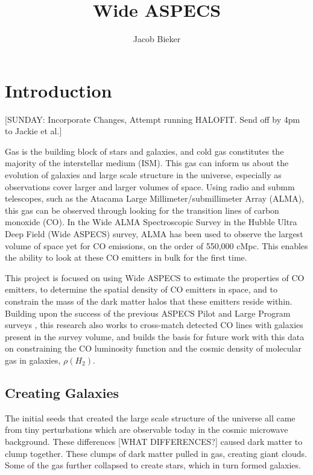 \documentclass[twoside,single]{lion-msc}
\title{Wide ASPECS}
\author{Jacob Bieker}
\affiliation{Leiden Observatory, Leiden University}
\begin{document}
\maketitle

\setcounter{page}{2}
\tableofcontents
\cleardoublepage

\setcounter{page}{1}
\chapter{Introduction}

[SUNDAY: Incorporate Changes, Attempt running HALOFIT. Send off by 4pm to Jackie et al.] 

Gas is the building block of stars and galaxies, and cold gas constitutes the majority of the interstellar medium (ISM). This gas can inform us about the evolution of galaxies and large scale structure in the universe, especially as observations cover larger and larger volumes of space. Using radio and submm telescopes, such as the Atacama Large Millimeter/submillimeter Array (ALMA), this gas can be observed through looking for the transition lines of carbon monoxide (CO). In the Wide ALMA Spectroscopic Survey in the Hubble Ultra Deep Field (Wide ASPECS) survey, ALMA has been used to observe the largest volume of space yet for CO emissions, on the order of 550,000 cMpc. This enables the ability to look at these CO emitters in bulk for the first time.

This project is focused on using Wide ASPECS to estimate the properties of CO emitters, to determine the spatial density of CO emitters in space, and to constrain the mass of the dark matter halos that these emitters reside within. Building upon the success of the previous ASPECS Pilot and Large Program surveys \cite{walter2016alma, decarli2019alma}, this research also works to cross-match detected CO lines with galaxies present in the survey volume, and builds the basis for future work with this data on constraining the CO luminosity function and the cosmic density of molecular gas in galaxies, $\rho(H_2)$.

\section{Creating Galaxies}

The initial seeds that created the large scale structure of the universe all came from tiny perturbations which are observable today in the cosmic microwave background. These differences [WHAT DIFFERENCES?] caused dark matter to clump together. These clumps of dark matter pulled in gas, creating giant clouds. Some of the gas further collapsed to create stars, which in turn formed galaxies.
\end{document}
